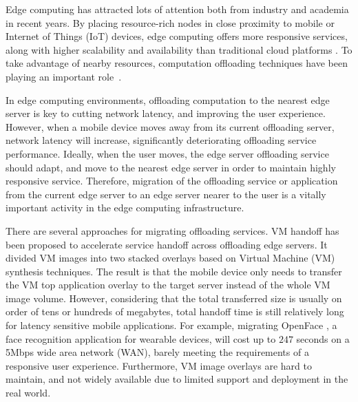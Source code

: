 
Edge computing has attracted lots of attention both from industry and academia in recent years\cite{satya2009case,  MEC2014initiative, MEC2015-5G, yi2015fog,yi2015survey,shi2016edge,chiang2016fog,satya2017edge}.
By placing resource-rich nodes in close proximity to mobile or Internet of Things (IoT) devices, edge computing offers more responsive services, along with higher scalability and availability than traditional cloud platforms \cite{MEC2014initiative,satya2017edge}.
To take advantage of nearby resources, computation offloading techniques have been playing an important role~\cite{cuervo2010maui,lane2016deepx,openface2016,liu2016paradrop}.

In edge computing environments, offloading computation to the nearest edge server is key to cutting network latency, and improving the user experience. 
However, when a mobile device moves away from its current offloading server, network latency will increase, significantly deteriorating offloading service performance. Ideally, when the user moves, the edge server offloading service should adapt, and move to the nearest edge server in order to maintain highly responsive service. 
Therefore, migration of the offloading service or application from the current edge server to an edge server nearer to the user is a vitally important activity in the edge computing infrastructure. 

There are several approaches for migrating offloading services. 
VM handoff \cite{ha2015vmhandoff} has been proposed to accelerate service handoff across offloading edge servers. It divided VM images into two stacked overlays based on Virtual Machine (VM) synthesis \cite{satya2009case} techniques. 
The result is that the mobile device only needs to transfer the VM top application overlay to the target server instead of the whole VM image volume. However, considering that the total transferred size is usually on order of tens or hundreds of megabytes, total handoff time is still relatively long for latency sensitive mobile applications. For example, migrating OpenFace \cite{openface2016}, a face recognition application for wearable devices, will cost up to $247$ seconds on a 5Mbps wide area network (WAN), barely meeting the requirements of a responsive user experience. 
Furthermore, VM image overlays are hard to maintain, and not widely available due to limited support and deployment in the real world.

